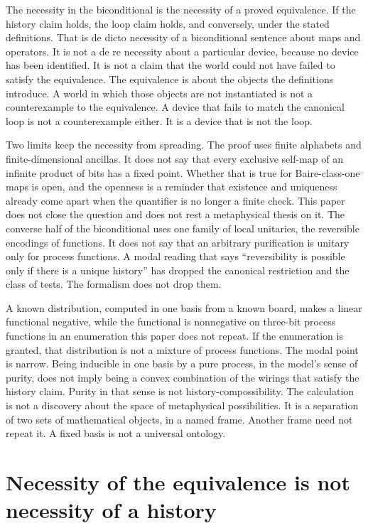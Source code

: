 \documentclass[11pt]{article}
\begin{document}
The necessity in the biconditional is the necessity of a proved equivalence. If the history claim holds, the loop claim holds, and conversely, under the stated definitions. That is de dicto necessity of a biconditional sentence about maps and operators. It is not a de re necessity about a particular device, because no device has been identified. It is not a claim that the world could not have failed to satisfy the equivalence. The equivalence is about the objects the definitions introduce. A world in which those objects are not instantiated is not a counterexample to the equivalence. A device that fails to match the canonical loop is not a counterexample either. It is a device that is not the loop.

Two limits keep the necessity from spreading. The proof uses finite alphabets and finite-dimensional ancillas. It does not say that every exclusive self-map of an infinite product of bits has a fixed point. Whether that is true for Baire-class-one maps is open, and the openness is a reminder that existence and uniqueness already come apart when the quantifier is no longer a finite check. This paper does not close the question and does not rest a metaphysical thesis on it. The converse half of the biconditional uses one family of local unitaries, the reversible encodings of functions. It does not say that an arbitrary purification is unitary only for process functions. A modal reading that says ``reversibility is possible only if there is a unique history'' has dropped the canonical restriction and the class of tests. The formalism does not drop them.

A known distribution, computed in one basis from a known board, makes a linear functional negative, while the functional is nonnegative on three-bit process functions in an enumeration this paper does not repeat. If the enumeration is granted, that distribution is not a mixture of process functions. The modal point is narrow. Being inducible in one basis by a pure process, in the model's sense of purity, does not imply being a convex combination of the wirings that satisfy the history claim. Purity in that sense is not history-compossibility. The calculation is not a discovery about the space of metaphysical possibilities. It is a separation of two sets of mathematical objects, in a named frame. Another frame need not repeat it. A fixed basis is not a universal ontology.

\section{Necessity of the equivalence is not necessity of a history}
\label{sec:nec}
\end{document}
